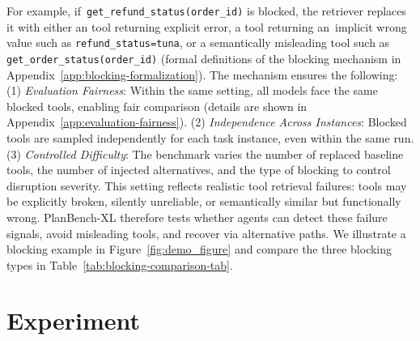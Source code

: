 \documentclass{llmxive}
\providecommand{\bench}[1]{PlanBench-XL}
\begin{document}
For example, if~\texttt{get\_refund\_status(order\_id)} is blocked, the retriever replaces it with either an tool returning explicit error, a tool returning an~implicit wrong value such as \texttt{refund\_status=tuna}, or a semantically misleading tool such as \texttt{get\_order\_status(order\_id)} (formal definitions of the blocking mechanism in Appendix~\ref{app:blocking-formalization}).
The mechanism ensures the following:
(1) \textit{Evaluation Fairness}: Within the same setting, all models face the same blocked tools, enabling fair comparison (details are shown in Appendix~\ref{app:evaluation-fairness}).
(2) \textit{Independence Across Instances}: Blocked tools are sampled independently for each task instance, even within the same run.
(3) \textit{Controlled Difficulty}: The benchmark varies the number of replaced baseline tools, the number of injected alternatives, and the type of blocking to control disruption severity.
This setting reflects realistic tool retrieval failures: tools may be explicitly broken, silently unreliable, or semantically similar but functionally wrong. 
\bench{} therefore tests whether agents can detect these failure signals, avoid misleading tools, and recover via alternative paths.
We illustrate a blocking example in Figure~\ref{fig:demo_figure} and compare the three blocking types in Table~\ref{tab:blocking-comparison-tab}.








\section{Experiment}
\end{document}
